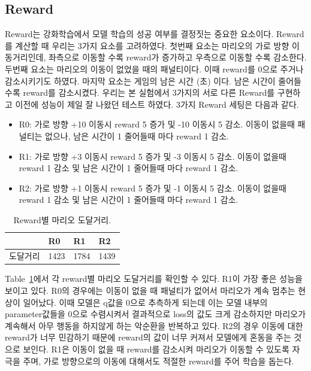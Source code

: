 \subsection{Reward}
\label{sec:exp:reward}
Reward는 강화학습에서 모델 학습의 성공 여부를 결정짓는 중요한 요소이다.
Reward를 계산할 때 우리는 3가지 요소를 고려하였다.
첫번째 요소는 마리오의 가로 방향 이동거리인데, 좌측으로 이동할 수록 reward가 증가하고 우측으로 이동할 수록 감소한다.
두번째 요소는 마리오의 이동이 없었을 때의 패널티이다.
이때 reward를 0으로 주거나 감소시키기도 하였다.
마지막 요소는 게임의 남은 시간 (초) 이다. 남은 시간이 줄어들 수록 reward를 감소시켰다.
우리는 본 실험에서 3가지의 서로 다른 Reward를 구현하고 이전에 성능이 제일 잘 나왔던  테스트 하였다.
3가지 Reward 세팅은 다음과 같다.
\begin{itemize}
	\item \textsc{R0}:
		가로 방향 +10 이동시 reward 5 증가 및 -10 이동시 5 감소. 이동이 없을때 패널티는 없으나, 남은 시간이 1 줄어들때 마다 reward 1 감소.
	\item \textsc{R1}:
		가로 방향 +3 이동시 reward 5 증가 및 -3 이동시 5 감소. 이동이 없을때 reward 1 감소 및 남은 시간이 1 줄어들때 마다 reward 1 감소.
	\item \textsc{R2}:
		가로 방향 +1 이동시 reward 5 증가 및 -1 이동시 5 감소. 이동이 없을때 reward 1 감소 및 남은 시간이 1 줄어들때 마다 reward 1 감소.
\end{itemize}

\begin{table}[h]
\centering
\caption {
	Reward별  마리오 도달거리.
}
\label{tab:reward}
\begin{tabular}{llll}
\toprule
     & R0  & R1 & R2 \\
\midrule
도달거리 & 1423 & 1784  & 1439  \\
\bottomrule
\end{tabular}
\end{table}

Table~\ref{tab:reward}에서 각 reward별  마리오 도달거리를 확인할 수 있다.
R1이 가장 좋은 성능을 보이고 있다.
R0의 경우에는 이동이 없을 때 패널티가 없어서 마리오가 계속 멈추는 현상이 일어났다.
이때 모델은 q값을 0으로 추측하게 되는데 이는 모델 내부의 parameter값들을 0으로 수렴시켜서 결과적으로 loss의 값도 크게 감소하지만 마리오가 계속해서 아무 행동을 하지않게 하는 악순환을 반복하고 있다.
R2의 경우 이동에 대한 reward가 너무 민감하기 때문에 reward의 값이 너무 커져서 모델에게 혼동을 주는 것으로 보인다.
R1은 이동이 없을 때 reward를 감소시켜 마리오가 이동할 수 있도록 자극을 주며, 가로 방향으로의 이동에 대해서도 적절한 reward를 주어  학습을 돕는다.

